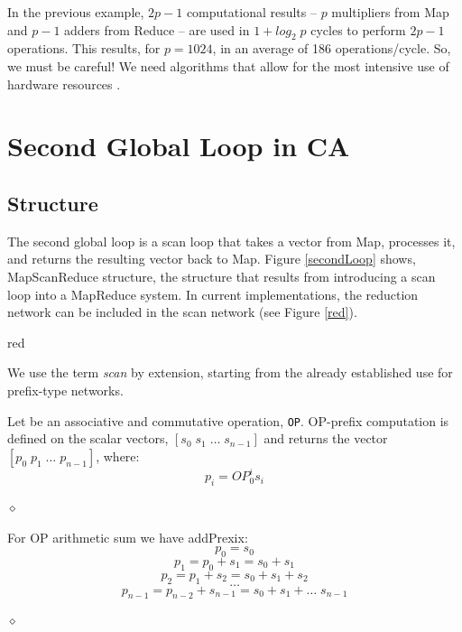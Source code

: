 In the previous example, $2p-1$ computational results -- $p$ multipliers from Map and $p-1$ adders from Reduce -- are used in $1+log_2 \; p$ cycles to perform $2p-1$ operations. This results, for $p=1024$, in an average of 186 operations/cycle. So, we must be careful! We need algorithms that allow for the most intensive use of hardware resources \cite{antonescu23}.

\section{Second Global Loop in CA}

\subsection{Structure}

The second global loop is a scan loop that takes a vector from Map, processes it, and returns the resulting vector back to Map. Figure \ref{secondLoop} shows, MapScanReduce structure, the structure that results from introducing a scan loop into a MapReduce system. In current implementations, the reduction network can be included in the scan network (see Figure \ref{red}).


 {red}

We use the term {\em scan} by extension, starting from the already established use for prefix-type networks.

\begin{definition}
Let be an associative and commutative  operation, {\tt OP}. OP-prefix computation is defined on the scalar vectors, $[s_0 \; s_1 \; \ldots \; s_{n-1}]$ and returns the vector $[p_0 \; p_1 \; \ldots \; p_{n-1}]$, where:
$$ p_i = OP_0^i s_i$$

$\diamond$
\end{definition}
\begin{exemplu}
For OP arithmetic sum we have addPrexix:
$$p_0 = s_0$$
$$p_1 = p_0 + s_1 = s_0 + s_1$$
$$p_2 = p_1 + s_2 = s_0 +s_1 + s_2$$
$$\ldots$$
$$p_{n-1} = p_{n-2} + s_{n-1} = s_0 + s_1 + \ldots \; s_{n-1}$$

$\diamond$
\end{exemplu}

